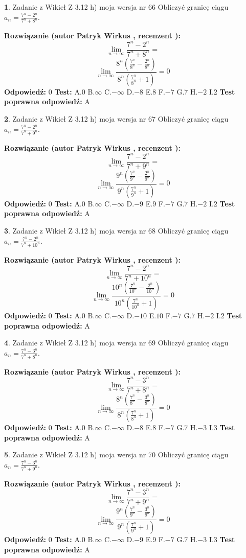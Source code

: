 \documentclass[12pt, a4paper]{article}
\theoremstyle{definition} %
\newtheorem{zad}{}
\newcommand{\zadStart}[1]{\begin{zad}#1\newline}
\newcommand{\zadStop}{\end{zad}}
\newcommand{\rozwStart}[2]{\noindent \textbf{Rozwiązanie (autor #1 , recenzent #2): }\newline}
\newcommand{\rozwStop}{\newline}
\newcommand{\odpStart}{\noindent \textbf{Odpowiedź:}\newline}
\newcommand{\odpStop}{\newline}
\newcommand{\testStart}{\noindent \textbf{Test:}\newline}
\newcommand{\testStop}{\newline}
\newcommand{\kluczStart}{\noindent \textbf{Test poprawna odpowiedź:}\newline}
\newcommand{\kluczStop}{\newline}
\begin{document}
\zadStart{Zadanie z Wikieł Z 3.12 h) moja wersja nr 66}
Obliczyć granicę ciągu $a_{n}=\frac{7^{n} - 2^{n}}{7^{n} + 8^{n}}$.
\zadStop
\rozwStart{Patryk Wirkus}{}
$$\lim\limits_{n\to\infty}\frac{7^{n} - 2^{n}}{7^{n} + 8^{n}}=$$
$$\lim\limits_{n\to\infty}\frac{8^{n}(\frac{7^{n}}{8^{n}} - \frac{2^{n}}{8^{n}})}{8^{n}(\frac{7^{n}}{8^{n}} + 1)} = 0$$
\rozwStop
\odpStart
$0$
\odpStop
\testStart
A.$0$
B.$\infty$
C.$-\infty$
D.$-8$
E.$8$
F.$-7$
G.$7$
H.$-2$
I.$2$
\testStop
\kluczStart
A
\kluczStop



\zadStart{Zadanie z Wikieł Z 3.12 h) moja wersja nr 67}
Obliczyć granicę ciągu $a_{n}=\frac{7^{n} - 2^{n}}{7^{n} + 9^{n}}$.
\zadStop
\rozwStart{Patryk Wirkus}{}
$$\lim\limits_{n\to\infty}\frac{7^{n} - 2^{n}}{7^{n} + 9^{n}}=$$
$$\lim\limits_{n\to\infty}\frac{9^{n}(\frac{7^{n}}{9^{n}} - \frac{2^{n}}{9^{n}})}{9^{n}(\frac{7^{n}}{9^{n}} + 1)} = 0$$
\rozwStop
\odpStart
$0$
\odpStop
\testStart
A.$0$
B.$\infty$
C.$-\infty$
D.$-9$
E.$9$
F.$-7$
G.$7$
H.$-2$
I.$2$
\testStop
\kluczStart
A
\kluczStop



\zadStart{Zadanie z Wikieł Z 3.12 h) moja wersja nr 68}
Obliczyć granicę ciągu $a_{n}=\frac{7^{n} - 2^{n}}{7^{n} + 10^{n}}$.
\zadStop
\rozwStart{Patryk Wirkus}{}
$$\lim\limits_{n\to\infty}\frac{7^{n} - 2^{n}}{7^{n} + 10^{n}}=$$
$$\lim\limits_{n\to\infty}\frac{10^{n}(\frac{7^{n}}{10^{n}} - \frac{2^{n}}{10^{n}})}{10^{n}(\frac{7^{n}}{10^{n}} + 1)} = 0$$
\rozwStop
\odpStart
$0$
\odpStop
\testStart
A.$0$
B.$\infty$
C.$-\infty$
D.$-10$
E.$10$
F.$-7$
G.$7$
H.$-2$
I.$2$
\testStop
\kluczStart
A
\kluczStop



\zadStart{Zadanie z Wikieł Z 3.12 h) moja wersja nr 69}
Obliczyć granicę ciągu $a_{n}=\frac{7^{n} - 3^{n}}{7^{n} + 8^{n}}$.
\zadStop
\rozwStart{Patryk Wirkus}{}
$$\lim\limits_{n\to\infty}\frac{7^{n} - 3^{n}}{7^{n} + 8^{n}}=$$
$$\lim\limits_{n\to\infty}\frac{8^{n}(\frac{7^{n}}{8^{n}} - \frac{3^{n}}{8^{n}})}{8^{n}(\frac{7^{n}}{8^{n}} + 1)} = 0$$
\rozwStop
\odpStart
$0$
\odpStop
\testStart
A.$0$
B.$\infty$
C.$-\infty$
D.$-8$
E.$8$
F.$-7$
G.$7$
H.$-3$
I.$3$
\testStop
\kluczStart
A
\kluczStop



\zadStart{Zadanie z Wikieł Z 3.12 h) moja wersja nr 70}
Obliczyć granicę ciągu $a_{n}=\frac{7^{n} - 3^{n}}{7^{n} + 9^{n}}$.
\zadStop
\rozwStart{Patryk Wirkus}{}
$$\lim\limits_{n\to\infty}\frac{7^{n} - 3^{n}}{7^{n} + 9^{n}}=$$
$$\lim\limits_{n\to\infty}\frac{9^{n}(\frac{7^{n}}{9^{n}} - \frac{3^{n}}{9^{n}})}{9^{n}(\frac{7^{n}}{9^{n}} + 1)} = 0$$
\rozwStop
\odpStart
$0$
\odpStop
\testStart
A.$0$
B.$\infty$
C.$-\infty$
D.$-9$
E.$9$
F.$-7$
G.$7$
H.$-3$
I.$3$
\testStop
\kluczStart
A
\kluczStop
\end{document}
